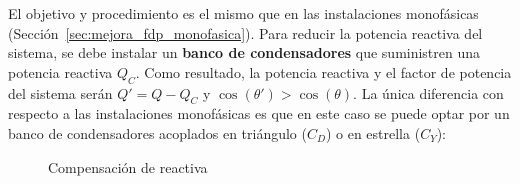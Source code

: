 El objetivo y procedimiento es el mismo que en las instalaciones
monofásicas (Sección~\ref{sec:mejora_fdp_monofasica}). Para reducir la
potencia reactiva del sistema, se debe instalar un \textbf{banco de
  condensadores} que suministren una potencia reactiva $Q_C$. Como
resultado, la potencia reactiva y el factor de potencia del sistema
serán $Q' = Q - Q_C$ y $\cos(\theta') > \cos (\theta)$. La única
diferencia con respecto a las instalaciones monofásicas es que en este
caso se puede optar por un banco de condensadores acoplados en
triángulo ($C_D$) o en estrella ($C_Y$):
\begin{figure}[H]
  \centering
  \hfil
  \caption{Compensación de reactiva}
\end{figure}
